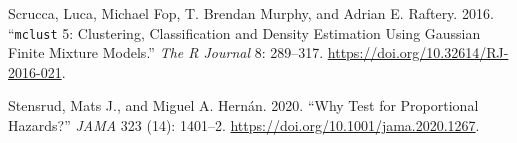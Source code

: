 \documentclass[
  11pt,
  letterpaper,
]{scrbook}
\newlength{\cslhangindent}
\newlength{\cslentryspacingunit} %
\newenvironment{CSLReferences}[2] %
 {%
  \setlength{\parindent}{0pt}
  \ifodd #1
  \let\oldpar\par
  \def\par{\hangindent=\cslhangindent\oldpar}
  \fi
  \setlength{\parskip}{#2\cslentryspacingunit}
 }%
 {}
\theoremstyle{definition}
\theoremstyle{remark}
\begin{document}
\begin{CSLReferences}{1}{0}
\leavevmode{}%
Scrucca, Luca, Michael Fop, T. Brendan Murphy, and Adrian E. Raftery.
2016. {``\texttt{mclust} 5: Clustering, Classification and Density
Estimation Using {G}aussian Finite Mixture Models.''} \emph{The R
Journal} 8: 289--317. \url{https://doi.org/10.32614/RJ-2016-021}.

\leavevmode{}%
Stensrud, Mats J., and Miguel A. Hernán. 2020. {``{Why Test for
Proportional Hazards?}''} \emph{JAMA} 323 (14): 1401--2.
\url{https://doi.org/10.1001/jama.2020.1267}.

\end{CSLReferences}


\backmatter
\end{document}
